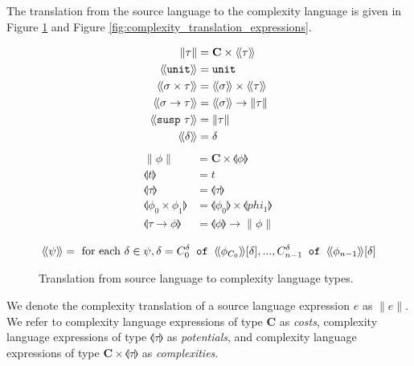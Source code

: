 The translation from the source language to the complexity language is given in
Figure \ref{fig:complexity_translation_types} and Figure
\ref{fig:complexity_translation_expressions}.
%
\begin{figure}
  \caption{Translation from source language to complexity language types.}
  \label{fig:complexity_translation_types}
  \begin{align*}
    \|\tau\| &= \textbf{C} \times \llangle \tau \rrangle \\
    \llangle\T{unit}\rrangle &= \T{unit} \\
    \llangle \sigma \times \tau \rrangle &= \llangle \sigma \rrangle \times \llangle \tau \rrangle \\
    \llangle \sigma \rightarrow \tau \rrangle &= \llangle \sigma \rrangle \rightarrow \|\tau\| \\
    \llangle \T{susp}\ \tau \rrangle &= \|\tau\| \\
    \llangle \delta \rrangle &= \delta \\
  \end{align*}
  \begin{align*}
    \|\phi\| &= \textbf{C} \times \llangle \phi \rrangle \\
    \llangle t \rrangle &= t \\
    \llangle \tau \rrangle &= \llangle \tau \rrangle \\
    \llangle \phi_0 \times \phi_1 \rrangle &= \llangle \phi_0 \rrangle \times \llangle phi_1 \rrangle \\
    \llangle \tau \rightarrow \phi \rrangle &= \llangle \phi \rrangle \rightarrow \|\phi\| \\
  \end{align*}
  \begin{align*}
    \langle\!\langle \psi \rangle\!\rangle &= \text{ for each }\delta \in \psi, \delta = C_0^\delta \texttt{ of } \langle\!\langle \phi_{C_0}\rangle\!\rangle[\delta], . . . , C_{n-1}^\delta \texttt{ of } \langle\!\langle \phi_{n-1}\rangle\!\rangle[\delta] \\
  \end{align*}
\end{figure}
%
We denote the complexity translation of a source language expression $e$ as
$\|e\|$. We refer to complexity language expressions of type \textbf{C} as
\textit{costs}, complexity language expressions of type $\llangle \tau \rrangle$ as
\textit{potentials}, and complexity language expressions of type
$\textbf{C}\times \llangle \tau \rrangle$ as \textit{complexities}.
